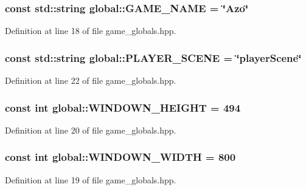 \subsubsection[{\texorpdfstring{G\+A\+M\+E\+\_\+\+N\+A\+ME}{GAME_NAME}}]{\setlength{\rightskip}{0pt plus 5cm}const std\+::string global\+::\+G\+A\+M\+E\+\_\+\+N\+A\+ME = \char`\"{}Azo\char`\"{}}\hypertarget{namespaceglobal_af594ce445ad5359fcf3bb29aca258017}{}\label{namespaceglobal_af594ce445ad5359fcf3bb29aca258017}


Definition at line 18 of file game\+\_\+globals.\+hpp.

\subsubsection[{\texorpdfstring{P\+L\+A\+Y\+E\+R\+\_\+\+S\+C\+E\+NE}{PLAYER_SCENE}}]{\setlength{\rightskip}{0pt plus 5cm}const std\+::string global\+::\+P\+L\+A\+Y\+E\+R\+\_\+\+S\+C\+E\+NE = \char`\"{}player\+Scene\char`\"{}}\hypertarget{namespaceglobal_a0ea2b548b86e5f30a4d4c54be44973e6}{}\label{namespaceglobal_a0ea2b548b86e5f30a4d4c54be44973e6}


Definition at line 22 of file game\+\_\+globals.\+hpp.

\subsubsection[{\texorpdfstring{W\+I\+N\+D\+O\+W\+N\+\_\+\+H\+E\+I\+G\+HT}{WINDOWN_HEIGHT}}]{\setlength{\rightskip}{0pt plus 5cm}const int global\+::\+W\+I\+N\+D\+O\+W\+N\+\_\+\+H\+E\+I\+G\+HT = 494}\hypertarget{namespaceglobal_a95b063ce316252a17eb13e6ed4e9e257}{}\label{namespaceglobal_a95b063ce316252a17eb13e6ed4e9e257}


Definition at line 20 of file game\+\_\+globals.\+hpp.

\subsubsection[{\texorpdfstring{W\+I\+N\+D\+O\+W\+N\+\_\+\+W\+I\+D\+TH}{WINDOWN_WIDTH}}]{\setlength{\rightskip}{0pt plus 5cm}const int global\+::\+W\+I\+N\+D\+O\+W\+N\+\_\+\+W\+I\+D\+TH = 800}\hypertarget{namespaceglobal_aa3c3915b40bcdd45215dc8f878b96952}{}\label{namespaceglobal_aa3c3915b40bcdd45215dc8f878b96952}


Definition at line 19 of file game\+\_\+globals.\+hpp.

